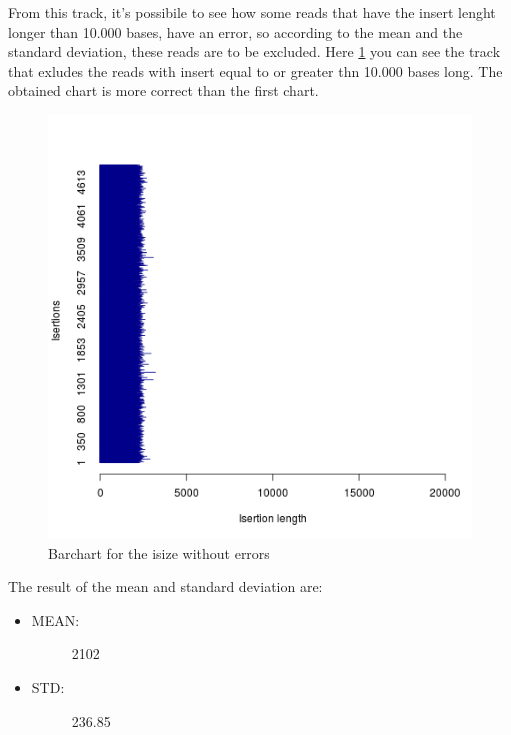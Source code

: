 From this track, it's possibile to see how some reads that have the insert lenght longer than 10.000 bases, have an error, so according to the mean and the standard deviation, these reads are to be excluded.
Here \ref{fig:2} you can see the track that exludes the reads with insert equal to or greater thn 10.000 bases long. The obtained chart is more correct than the first chart.
 \begin{figure}[H]
				\centering
				\includegraphics[scale=0.8]{immagini/r1.png}
				\caption{Barchart for the isize without errors}\label{fig:2}
				\end{figure}

The result of the mean and standard deviation are:
\begin{itemize}
\item \begin{description}
		\item[MEAN:] 2102
  \end{description}
\end{itemize}

\begin{itemize}
\item \begin{description}
		\item[STD:] 236.85
  \end{description}
\end{itemize}


